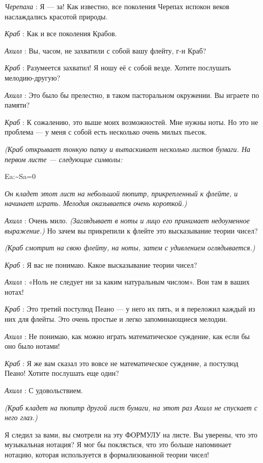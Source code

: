 \documentclass[../main.tex]{subfiles}
\begin{document}
\begin{dialogue}
\emph{Черепаха} : Я --- за! Как известно, все поколения Черепах испокон веков наслаждались красотой природы.

\emph{Краб} : Как и все поколения Крабов.

\emph{Ахилл} : Вы, часом, не захватили с собой вашу флейту, г-н Краб?

\emph{Краб} : Разумеется захватил! Я ношу её с собой везде. Хотите послушать мелодию-другую?

\emph{Ахилл} : Это было бы прелестно, в таком пасторальном окружении. Вы играете по памяти?

\emph{Краб} : К сожалению, это выше моих возможностей. Мне нужны ноты. Но это не проблема --- у меня с собой есть несколько очень милых пьесок.

\emph{(Краб открывает тонкую папку и вытаскивает несколько листов бумаги. На первом листе --- следующие символы:}

Ea:\textasciitilde Sa=0

\emph{Он кладет этот лист на небольшой пюпитр, прикрепленный к флейте, и начинает играть. Мелодия оказывается очень короткой.)}

\emph{Ахилл} : Очень мило. \emph{(Заглядывает в ноты и лицо его принимает недоуменное выражение.)} Но зачем вы прикрепили к флейте это высказывание теории чисел?

\emph{(Краб смотрит на свою флейту, на ноты, затем с удивлением оглядывается.)}

\emph{Краб} : Я вас не понимаю. Какое высказывание теории чисел?

\emph{Ахилл} : «Ноль не следует ни за каким натуральным числом». Вон там в ваших нотах!

\emph{Краб} : Это третий постулюд Пеано --- у него их пять, и я переложил каждый из них для флейты. Это очень простые и легко запоминающиеся мелодии.

\emph{Ахилл} : Не понимаю, как можно играть математическое суждение, как если бы оно было нотами!

\emph{Краб} : Я же вам сказал это вовсе не математическое суждение, а постулюд Пеано! Хотите послушать еще один?

\emph{Ахилл} : С удовольствием.

\emph{(Краб кладет на пюпитр другой лист бумаги, на этот раз Ахилл не спускает с него глаз.)}

Я следил за вами, вы смотрели на эту ФОРМУЛУ на листе. Вы уверены, что это музыкальная нотация? Я мог бы поклясться, что это больше напоминает нотацию, которая используется в формализованной теории чисел!


\end{dialogue}
\end{document}
